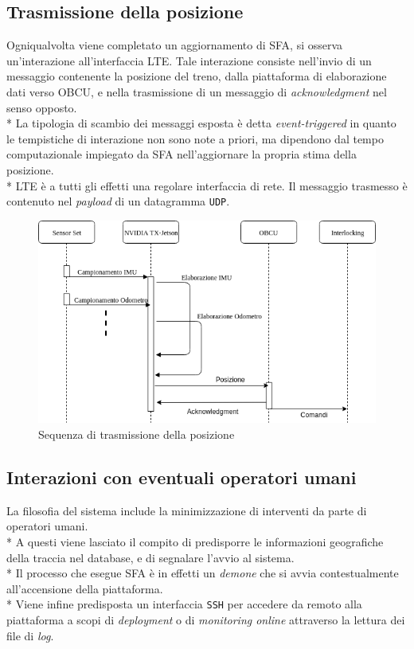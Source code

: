 	\subsection{Trasmissione della posizione}
	Ogniqualvolta viene completato un aggiornamento di SFA, si osserva un'interazione all'interfaccia LTE. Tale interazione consiste nell'invio di un messaggio contenente la posizione del treno, dalla piattaforma di elaborazione dati verso OBCU, e nella trasmissione di un messaggio di \emph{acknowledgment} nel senso opposto.\\*
	La tipologia di scambio dei messaggi esposta \`e detta \emph{event-triggered} \cite{evttimetriggered} in quanto le tempistiche di interazione non sono note a priori, ma dipendono dal tempo computazionale impiegato da SFA nell'aggiornare la propria stima della posizione.\\*
	LTE \`e a tutti gli effetti una regolare interfaccia di rete. Il messaggio trasmesso \`e contenuto nel \emph{payload} di un datagramma \texttt{UDP}.
	\begin{figure}[h]
		\centering
		\includegraphics[width=0.7\linewidth]{img/seqdiag2}
		\caption{Sequenza di trasmissione della posizione}
		\label{fig:seqdiag2}
	\end{figure}
	\FloatBarrier
	\subsection{Interazioni con eventuali operatori umani}
	La filosofia del sistema include la minimizzazione di interventi da parte di operatori umani.\\*
	A questi viene lasciato il compito di predisporre le informazioni geografiche della traccia nel database, e di segnalare l'avvio al sistema.\\*
	Il processo che esegue SFA \`e in effetti un \emph{demone} che si avvia contestualmente all'accensione della piattaforma.\\*
	Viene infine predisposta un interfaccia \texttt{SSH} per accedere da remoto alla piattaforma a scopi di \emph{deployment} o di \emph{monitoring online} attraverso la lettura dei file di \emph{log}.
